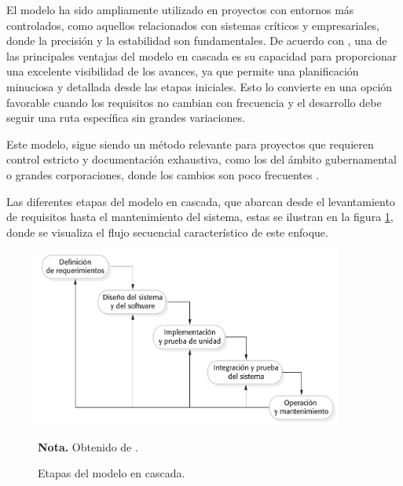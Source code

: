 		El modelo ha sido ampliamente utilizado en proyectos con entornos más controlados, como aquellos relacionados con sistemas críticos y empresariales, donde la precisión y la estabilidad son fundamentales. De acuerdo con \textcite{pressman2010ingenieria}, una de las principales ventajas del modelo en cascada es su capacidad para proporcionar una excelente visibilidad de los avances, ya que permite una planificación minuciosa y detallada desde las etapas iniciales. Esto lo convierte en una opción favorable cuando los requisitos no cambian con frecuencia y el desarrollo debe seguir una ruta específica sin grandes variaciones.
		
		Este modelo, sigue siendo un método relevante para proyectos que requieren control estricto y documentación exhaustiva, como los del ámbito gubernamental o grandes corporaciones, donde los cambios son poco frecuentes \parencite{sommerville2011introduccion}.
		
		Las diferentes etapas del modelo en cascada, que abarcan desde el levantamiento de requisitos hasta el mantenimiento del sistema, estas se ilustran en la figura \ref{fig:figura2_1}, donde se visualiza el flujo secuencial característico de este enfoque.
		
		\vspace{0.3cm} %
		
		\begin{figure}[h] %
			\caption[Etapas del modelo en cascada]
			{\newline Etapas del modelo en cascada.} %
			\centering
			\includegraphics[width=0.9\textwidth]{imagenes/figura2_1.png} %
			
			\begin{flushleft}
				\hspace{1.20cm} \textbf{Nota.} Obtenido de \textcite{sommerville2011introduccion}. %
			\end{flushleft}
			\vspace{-16pt}
			\label{fig:figura2_1} %
		\end{figure}
		
